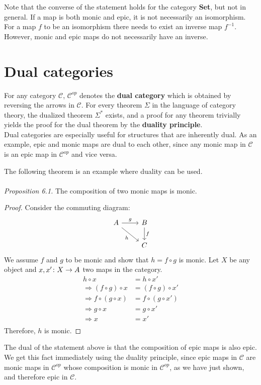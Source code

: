 Note that the converse of the statement holds for the category \textbf{Set}, but not in general.
If a map is both monic and epic, it is not necessarily an isomorphism.
For a map $f$ to be an isomorphism there needs to exist an inverse map $f^{-1}$.
However, monic and epic maps do not necessarily have an inverse.\\

\section {Dual categories}

For any category $\mathscr{C}$, $\mathscr{C}^{op}$ denotes the \textbf{dual category}
which is obtained by reversing the arrows in $\mathscr{C}$.
For every theorem $\Sigma$ in the language of category theory,
the dualized theorem $\Sigma^*$ exists,
and a proof for any theorem trivially yields the proof for the dual theorem by the \textbf{duality principle}.\\
Dual categories are especially useful for structures that are inherently dual.
As an example, epic and monic maps are dual to each other, since any monic map in $\mathscr{C}$
is an epic map in $\mathscr{C}^{op}$ and vice versa.

The following theorem is an example where duality can be used.\\\\
\textit{Proposition 6.1.} The composition of two monic maps is monic.

\begin{proof}
  Consider the commuting diagram:
  \[
    \begin{tikzcd}
      A \arrow[dr, swap, "h"] \arrow{r}{g} & B \arrow{d}{f} \\
      & C
    \end{tikzcd}
  \]
  We assume $f$ and $g$ to be monic and show that $h = f \circ g $ is monic.
  Let $X$ be any object and $x, x' \from X \to A$ two maps in the category.
  \begin{align*}
    h \circ x &= h \circ x' \\
   \Rightarrow (f \circ g) \circ x &= (f \circ g) \circ x' \\
    \Rightarrow f \circ (g \circ x) &= f \circ (g \circ x') \\
    \Rightarrow g \circ x &= g \circ x' \\
    \Rightarrow x &= x' \\
  \end{align*}
  Therefore, $h$ is monic.
\end{proof}
The dual of the statement above is that the composition of epic maps is also epic.
We get this fact immediately using the duality principle, since epic maps in $\mathscr{C}$
are monic maps in $\mathscr{C}^{op}$ whose composition is monic in $\mathscr{C}^{op}$, as we
have just shown, and therefore epic in $\mathscr{C}$.

